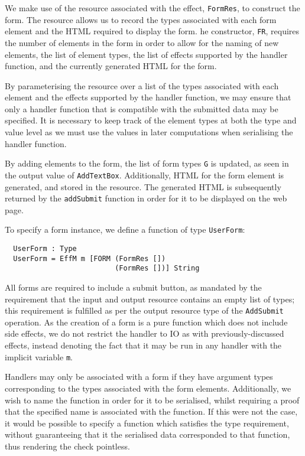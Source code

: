 \documentclass[preprint]{sigplanconf}
\begin{document}
We make use of the resource associated with the effect, \texttt{FormRes}, to
construct the form. The resource allows us to record the types associated with
each form element and the HTML required to display the form. he constructor,
\texttt{FR}, requires the number of elements in the form in order to allow for
the naming of new elements, the list of element types, the list of effects
supported by the handler function, and the currently generated HTML for the
form. 

By parameterising the resource over a list of the types associated with each element and the effects supported by the handler function, we may ensure that only a handler function that is compatible with the submitted data may be specified. It is necessary to keep track of the element types at both the type and value level as we must use the values in later computations when serialising the handler function. 

By adding elements to the form, the list of form types \texttt{G} is updated, as seen in the output value of \texttt{AddTextBox}. Additionally, HTML for the form element is generated, and stored in the resource. The generated HTML is subsequently returned by the \texttt{addSubmit} function in order for it to be displayed on the web page.

To specify a form instance, we define a function of type \texttt{UserForm}:
\begin{Verbatim}
  UserForm : Type
  UserForm = EffM m [FORM (FormRes []) 
                          (FormRes [])] String
\end{Verbatim}
All forms are required to include a submit button, as mandated by the
requirement that the input and output resource contains an empty list of types;
this requirement is fulfilled as per the output resource type of the
\texttt{AddSubmit} operation. As the creation of a form is a pure function
which does not include side effects, we do not restrict the handler to IO as
with previously-discussed effects, instead denoting the fact that it may be run
in any handler with the implicit variable \texttt{m}.

Handlers may only be associated with a form if they have argument types corresponding to the types associated with the form elements. Additionally, we wish to name the function in order for it to be serialised, whilst requiring a proof that the specified name is associated with the function. If this were not the case, it would be possible to specify a function which satisfies the type requirement, without guaranteeing that it the serialised data corresponded to that function, thus rendering the check pointless. 
\end{document}
